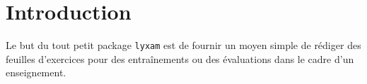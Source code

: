 \documentclass[12pt,a4paper]{scrartcl}
\begin{document}
\section{Introduction}

Le but du tout petit package \verb+lyxam+ est de fournir un moyen simple de rédiger des feuilles d'exercices pour des entraînements ou des évaluations dans le cadre d'un enseignement.
\end{document}
